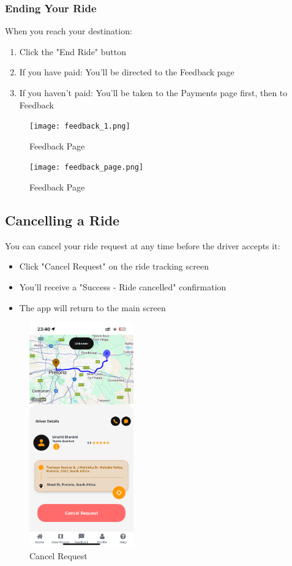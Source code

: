 \documentclass[12pt]{article}
\begin{document}
\subsubsection{Ending Your Ride}
When you reach your destination:
\begin{enumerate}
    \item Click the "End Ride" button
    \item If you have paid: You'll be directed to the Feedback page
    \item If you haven't paid: You'll be taken to the Payments page first, then to Feedback
\end{enumerate}

\begin{figure}[H]
  \centering
  \texttt{[image: feedback\_1.png]}
  \caption{Feedback Page }
\end{figure}

\begin{figure}[H]
  \centering
  \texttt{[image: feedback\_page.png]}
  \caption{Feedback Page}
\end{figure}

\subsection{Cancelling a Ride}

You can cancel your ride request at any time before the driver accepts it:
\begin{itemize}
    \item Click "Cancel Request" on the ride tracking screen
    \item You'll receive a "Success - Ride cancelled" confirmation
    \item The app will return to the main screen
\end{itemize}

\begin{figure}[H]
  \centering
  \includegraphics[width=0.4\textwidth]{cancel_request.png}
  \caption{Cancel Request}
\end{figure}
\end{document}
